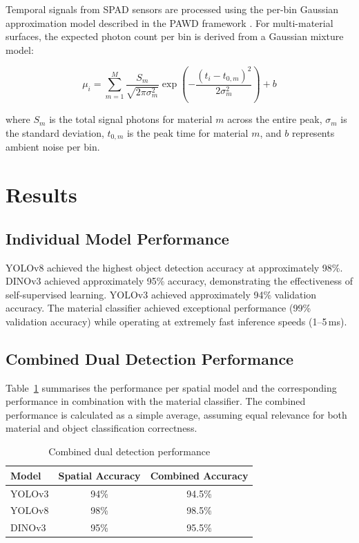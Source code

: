 \documentclass[10pt,twocolumn]{article}
\begin{document}
Temporal signals from SPAD sensors are processed using the per-bin Gaussian approximation model described in the PAWD framework \cite{tontini2020,koerner2021}. For multi-material surfaces, the expected photon count per bin is derived from a Gaussian mixture model:

\begin{equation}
\mu_i = \sum_{m=1}^{M} \frac{S_m}{\sqrt{2\pi\sigma_m^2}} \exp\left(-\frac{(t_i - t_{0,m})^2}{2\sigma_m^2}\right) + b
\end{equation}

where $S_m$ is the total signal photons for material $m$ across the entire peak, $\sigma_m$ is the standard deviation, $t_{0,m}$ is the peak time for material $m$, and $b$ represents ambient noise per bin.

\section{Results}

\subsection{Individual Model Performance}

YOLOv8 achieved the highest object detection accuracy at approximately 98\%. DINOv3 achieved approximately 95\% accuracy, demonstrating the effectiveness of self-supervised learning. YOLOv3 achieved approximately 94\% validation accuracy. The material classifier achieved exceptional performance (99\% validation accuracy) while operating at extremely fast inference speeds (1--5\,ms).

\subsection{Combined Dual Detection Performance}

Table~\ref{tab:combined_performance} summarises the performance per spatial model and the corresponding performance in combination with the material classifier. The combined performance is calculated as a simple average, assuming equal relevance for both material and object classification correctness.

\begin{table}[h]
\centering
\caption{Combined dual detection performance}
\label{tab:combined_performance}
\begin{tabular}{lcc}
\hline
Model & Spatial Accuracy & Combined Accuracy \\
\hline
YOLOv3 & 94\% & 94.5\% \\
YOLOv8 & 98\% & 98.5\% \\
DINOv3 & 95\% & 95.5\% \\
\hline
\end{tabular}
\end{table}
\end{document}

